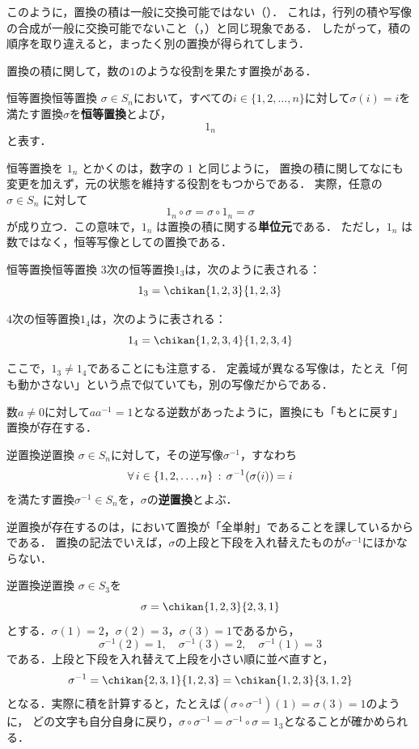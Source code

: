 このように，置換の積は一般に交換可能ではない（）．
これは，行列の積や写像の合成が一般に交換可能でないこと（，）と同じ現象である．
したがって，積の順序を取り違えると，まったく別の置換が得られてしまう．

置換の積に関して，数の$1$のような役割を果たす置換がある．



\begin{definition}{恒等置換}{恒等置換}
  $\sigma\in S_n$において，すべての$i \in \{1, 2, \dots, n\}$に対して$\sigma(i) = i$を満たす置換$\sigma$を\textbf{恒等置換}とよび，
  \[
  1_n
  \]
  と表す．
\end{definition}


恒等置換を $1_n$ とかくのは，数字の $1$ と同じように，
置換の積に関してなにも変更を加えず，元の状態を維持する役割をもつからである．
実際，任意の $\sigma\in S_n$ に対して
\[
1_n\circ\sigma=\sigma\circ 1_n=\sigma
\]
が成り立つ．この意味で，$1_n$ は置換の積に関する\textbf{単位元}である．
ただし，$1_n$ は数ではなく，恒等写像としての置換である．


\begin{example}{恒等置換}{恒等置換}
  $3$次の恒等置換$1_3$は，次のように表される：
  \[
  1_3 = \chikan{1, 2, 3}{1, 2, 3}
  \]

  $4$次の恒等置換$1_4$は，次のように表される：
  \[
  1_4 = \chikan{1, 2, 3, 4}{1, 2, 3, 4}
  \]

  ここで，$1_3 \ne 1_4$であることにも注意する．
  定義域が異なる写像は，たとえ「何も動かさない」という点で似ていても，別の写像だからである．
\end{example}

数$a \ne 0$に対して$a a^{-1} = 1$となる逆数があったように，置換にも「もとに戻す」置換が存在する．

\begin{definition}{逆置換}{逆置換}
  $\sigma\in S_n$に対して，その逆写像$\sigma^{-1}$，すなわち
  \[
  \forall\, i \in \{1, 2, \dots, n\} \,:\, \sigma^{-1}(\sigma(i)) = i
  \]
  を満たす置換$\sigma^{-1} \in S_n$を，$\sigma$の\textbf{逆置換}とよぶ．
\end{definition}

逆置換が存在するのは，において置換が「全単射」であることを課しているからである．
置換の記法でいえば，$\sigma$の上段と下段を入れ替えたものが$\sigma^{-1}$にほかならない．

\begin{example}{逆置換}{逆置換}
  $\sigma \in S_3$を
  \[
  \sigma = \chikan{1, 2, 3}{2, 3, 1}
  \]
  とする．$\sigma(1) = 2$，$\sigma(2) = 3$，$\sigma(3) = 1$であるから，
  \[
    \sigma^{-1}(2) = 1, \quad \sigma^{-1}(3) = 2, \quad \sigma^{-1}(1) = 3
  \]
  である．上段と下段を入れ替えて上段を小さい順に並べ直すと，
  \[
  \sigma^{-1} = \chikan{2, 3, 1}{1, 2, 3} = \chikan{1, 2, 3}{3, 1, 2}
  \]
  となる．実際に積を計算すると，たとえば$(\sigma \circ \sigma^{-1})(1) = \sigma(3) = 1$のように，
  どの文字も自分自身に戻り，$\sigma \circ \sigma^{-1} = \sigma^{-1} \circ \sigma = 1_3$となることが確かめられる．
\end{example}

